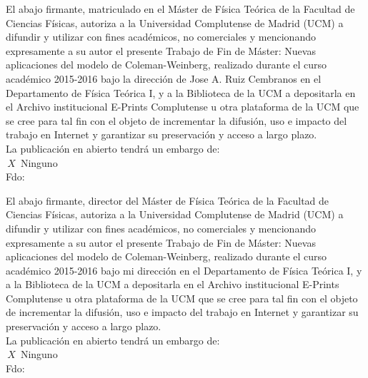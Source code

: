 \documentclass[aps,prd,preprintnumbers,nofootinbibn,twocolumn]{revtex4}
\begin{document}

 

\newpage
\clearpage

\begin{widetext}
El abajo firmante, matriculado en el Máster de Física Teórica de la Facultad de Ciencias Físicas, autoriza a la Universidad Complutense de Madrid (UCM) a difundir y utilizar con fines académicos, no comerciales y mencionando expresamente a su autor el presente Trabajo de Fin de Máster: Nuevas aplicaciones del modelo de Coleman-Weinberg, realizado durante el curso académico 2015-2016 bajo la dirección de Jose A. Ruiz Cembranos en el Departamento de Física Teórica I, y a la Biblioteca de la UCM a depositarla en el Archivo institucional E-Prints Complutense u otra plataforma de la UCM que se cree para tal fin con el objeto de incrementar la difusión, uso e impacto del trabajo en Internet y garantizar su preservación y acceso a largo plazo.\\

La publicación en abierto tendrá un embargo de:
\\

\noindent$\,X\,$ Ninguno
\\


Fdo:\\


\vspace{3cm}

El abajo firmante, director del Máster de Física Teórica de la Facultad de Ciencias Físicas, autoriza a la Universidad Complutense de Madrid (UCM) a difundir y utilizar con fines académicos, no comerciales y mencionando expresamente a su autor el presente Trabajo de Fin de Máster: Nuevas aplicaciones del modelo de Coleman-Weinberg, realizado durante el curso académico 2015-2016 bajo mi dirección en el Departamento de Física Teórica I, y a la Biblioteca de la UCM a depositarla en el Archivo institucional E-Prints Complutense u otra plataforma de la UCM que se cree para tal fin con el objeto de incrementar la difusión, uso e impacto del trabajo en Internet y garantizar su preservación y acceso a largo plazo.\\

La publicación en abierto tendrá un embargo de:
\\

\noindent$\,X\,$ Ninguno
\\


Fdo:\\


\vspace{12cm}

\end{widetext}
\end{document}
